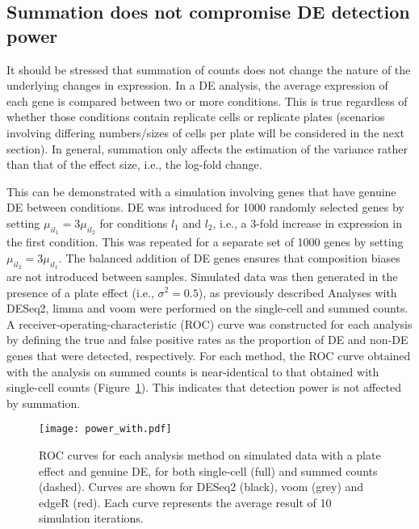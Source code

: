 \documentclass{article}
\begin{document}
\subsection{Summation does not compromise DE detection power}
It should be stressed that summation of counts does not change the nature of the underlying changes in expression.
In a DE analysis, the average expression of each gene is compared between two or more conditions.
This is true regardless of whether those conditions contain replicate cells or replicate plates 
    (scenarios involving differing numbers/sizes of cells per plate will be considered in the next section).
In general, summation only affects the estimation of the variance rather than that of the effect size, i.e., the log-fold change.

This can be demonstrated with a simulation involving genes that have genuine DE between conditions.
DE was introduced for 1000 randomly selected genes by setting $\mu_{il_1} = 3\mu_{il_2}$ for conditions $l_1$ and $l_2$, i.e., a 3-fold increase in expression in the first condition.
This was repeated for a separate set of 1000 genes by setting $\mu_{il_2} = 3\mu_{il_1}$.
The balanced addition of DE genes ensures that composition biases \cite{robinson2010scaling} are not introduced between samples.
Simulated data was then generated in the presence of a plate effect (i.e., $\sigma^2=0.5$), as previously described
Analyses with DESeq2, limma and voom were performed on the single-cell and summed counts.
A receiver-operating-characteristic (ROC) curve was constructed for each analysis by defining the true and false positive rates as the proportion of DE and non-DE genes that were detected, respectively.
For each method, the ROC curve obtained with the analysis on summed counts is near-identical to that obtained with single-cell counts (Figure~\ref{fig:roc}).
This indicates that detection power is not affected by summation.

\begin{figure}[tbp]
\begin{center}
\texttt{[image: power\_with.pdf]}
\end{center}
\caption{
    ROC curves for each analysis method on simulated data with a plate effect and genuine DE, for both single-cell (full) and summed counts (dashed).
    Curves are shown for DESeq2 (black), voom (grey) and edgeR (red).
    Each curve represents the average result of 10 simulation iterations.
}
\label{fig:roc}
\end{figure}
\end{document}
